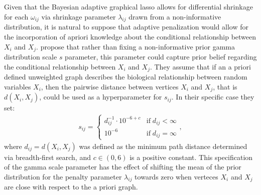 \documentclass[11pt]{article}
\begin{document}
Given that the Bayesian adaptive graphical lasso allows for differential shrinkage for each $\omega_{ij}$ via shrinkage parameter $\lambda_{ij}$ drawn from a non-informative distribution, it is natural to suppose that adaptive penalization would allow for the incorporation of apriori knowledge about the conditional relationship between $X_i$ and $X_j$. \cite{peterson2013} propose that rather than fixing a non-informative prior gamma distribution scale $s$ parameter, this parameter could capture prior belief regarding the conditional relationship between $X_i$ and $X_j$. They assume that if an a priori defined unweighted graph describes the biological relationship between random variables $X_i$, then  the pairwise distance between vertices $X_i$ and $X_j$, that is $d(X_i,X_j)$, could be used as a hyperparameter for $s_{ij}$. In their specific case they set:
\begin{align}
	s_{ij}=
	\begin{cases} 
	d_{ij}^{-1} \cdot  10^{-6+c} & \text{if} \; d_{ij}<\infty \\
	10^{-6} & \text{if} \; d_{ij}=\infty
	\end{cases},
\end{align}
where $d_{ij}=d(X_i,X_j)$ was defined as the minimum path distance determined via breadth-first search, and $c\in (0,6)$ is a positive constant. This specification of the gamma scale parameter has the effect of shifting the mean of the prior distribution for the penalty parameter $\lambda_{ij}$ towards zero when verteces $X_i$ and $X_j$ are close with respect to the a priori graph.
\end{document}
